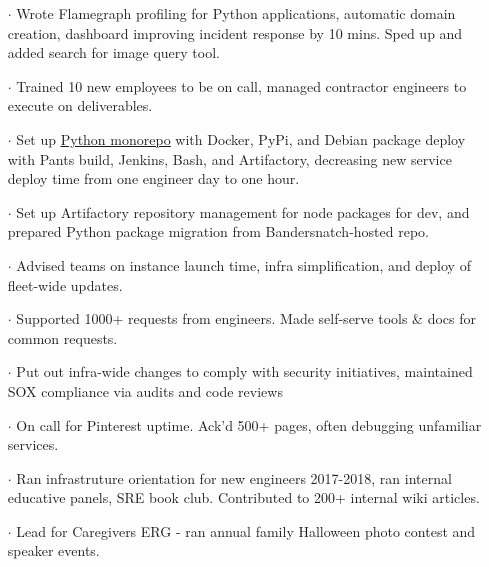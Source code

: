\documentclass[letterpaper, oneside, final]{scrartcl} %
\begin{document}
\begin{center}
\begin{itemize}
\item[$\cdot$] Wrote Flamegraph profiling for Python applications, automatic domain creation, dashboard improving incident response by 10 mins. Sped up and added search for image query tool.\\[10pt]
\item[$\cdot$] Trained 10 new employees to be on call, managed contractor engineers to execute on deliverables.\\[10pt]
\item[$\cdot$] Set up \underline{\href{https://medium.com/pinterest-engineering/building-a-python-monorepo-for-fast-reliable-development-be763781f67}{Python monorepo}} with Docker, PyPi, and Debian package deploy with Pants build, Jenkins, Bash, and Artifactory, decreasing new service deploy time from one engineer day to one hour.\\[10pt]
\item[$\cdot$] Set up Artifactory repository management for node packages for dev, and prepared Python package migration from Bandersnatch-hosted repo.\\[10pt]
\item[$\cdot$] Advised teams on instance launch time, infra simplification, and deploy of fleet-wide updates.\\[10pt]
\item[$\cdot$] Supported 1000+ requests from engineers. Made self-serve tools \& docs for common requests.\\[10pt]
\item[$\cdot$] Put out infra-wide changes to comply with security initiatives, maintained SOX compliance via audits and code reviews\\[10pt]
\item[$\cdot$] On call for Pinterest uptime. Ack'd 500+ pages, often debugging unfamiliar services.\\[10pt]
\item[$\cdot$] Ran infrastruture orientation for new engineers 2017-2018, ran internal educative panels, SRE book club. Contributed to 200+ internal wiki articles.\\[10pt]
\item[$\cdot$] Lead for Caregivers ERG - ran annual family Halloween photo contest and speaker events.\\

\end{itemize}


\end{center}
\end{document}
